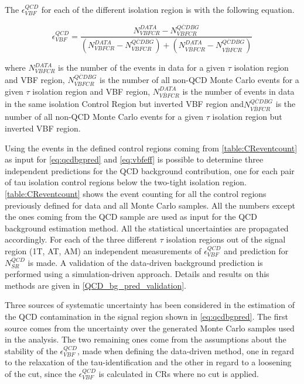 The $\epsilon^{QCD}_{VBF}$ for each of the different \hadtau isolation region is with the following equation.

\begin{equation}
\epsilon^{QCD}_{VBF} = \frac {N^{DATA}_{VBF CR} - N^{\overline{QCD} BG}_{VBFCR}}{\left( N^{DATA}_{VBFCR} - N^{\overline{QCD} BG}_{VBFCR} \right) + \left( N^{DATA}_{\overline{VBF}CR} - N^{\overline{QCD} BG}_{\overline{VBF}CR} \right) }
\label{eq:vbfeff}
\end{equation}

where $N^{DATA}_{VBF CR}$ is the number of the events in data for a given $ \tau $ isolation region and VBF region, $N^{\overline{QCD} BG}_{VBFCR}$ is the number of all non-QCD Monte Carlo events for a given $ \tau $ isolation region and VBF region, $N^{DATA}_{\overline{VBF}CR}$ is the number of events in data in the same isolation Control Region but inverted VBF region and$N^{\overline{QCD} BG}_{\overline{VBF}CR}$ is the number of all non-QCD Monte Carlo events for a given $ \tau $ isolation region but inverted VBF region.

Using the events in the defined control regions coming from \autoref{table:CReventcount} as input for \autoref{eq:qcdbgpred} and \autoref{eq:vbfeff} is possible to determine three independent predictions for the QCD background contribution, one for each pair of tau isolation control regions below the two-tight isolation region. \autoref{table:CReventcount} shows the event counting for all the control regions previously defined for data and all Monte Carlo samples. All the numbers except the ones coming from the QCD sample are used as input for the QCD background estimation method. All the statistical uncertainties are propagated accordingly.  For each of the three different $\tau$ isolation regions out of the signal region (1T, AT, AM) an independent measurements of $\epsilon^{QCD}_{VBF}$  and prediction for $N^{QCD}_{SR}$ is made. A validation of the data-driven background prediction is performed  using a simulation-driven approach. Details and results on this methods are given in \autoref{QCD_bg_pred_validation}.

Three sources of systematic uncertainty has been considered in the estimation of the QCD contamination in the signal region shown in \autoref{eq:qcdbgpred}. The first source comes from the uncertainty over the generated Monte Carlo samples used in the analysis. The two remaining ones come from the assumptions about the stability of the $\epsilon^{QCD}_{VBF}$, made when defining the data-driven method, one in regard to the relaxation of the tau-identification and the other in regard to a loosening of the \met cut, since the $\epsilon^{QCD}_{VBF}$ is calculated in CRs where no \met cut is applied.

